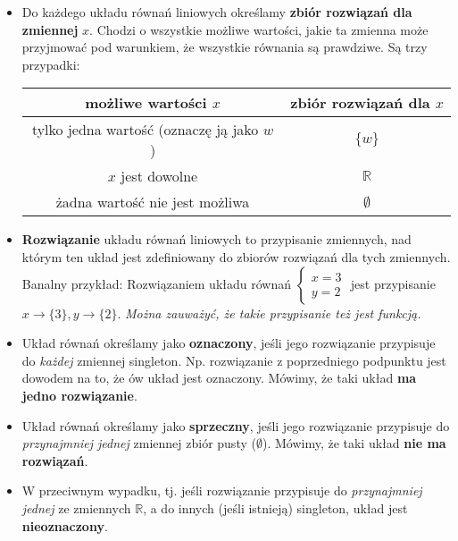 \documentclass{article}
\theoremstyle{remark}
\begin{document}
\begin{itemize}
\begin{align*}
\begin{array}{lllllll}
      4x &+& \tfrac74y &+&9z &=& 3
    \end{array}
    \right.
  \end{align*}
  Oczywiście, układ równań jest zdefiniowany nad tymi zmiennymi, nad
  którymi są zdefiniowane jego równania.
  Ale, \textit{możemy} też sobie powiedzieć,
  że pewien konkretny układ jest nad innymi zmiennymi.
  Wtedy powiemy sobie, że każde z jego równań również
  jest nad tymi zmiennymi.
  \item Do każdego układu równań liniowych określamy \textbf{zbiór rozwiązań
  dla zmiennej} $x$.
  Chodzi o wszystkie możliwe wartości, jakie ta zmienna może przyjmować
  pod warunkiem, że wszystkie równania są prawdziwe.
  Są trzy przypadki:
  \begin{center}
    \begin{tabular}{|c|c|}
      \hline
      możliwe wartości $x$ &zbiór rozwiązań dla $x$\\
      \hline\hline
      tylko jedna wartość (oznaczę ją jako $w$) & $\{w\}$\\
      \hline
      $x$ jest dowolne & $\mathbb R$\\
      \hline
      żadna wartość nie jest możliwa & $\emptyset$\\
      \hline
    \end{tabular}
  \end{center}

  \item \textbf{Rozwiązanie} układu równań liniowych to
  przypisanie zmiennych, nad którym ten układ jest zdefiniowany do
  zbiorów rozwiązań dla tych zmiennych. Banalny przykład:
  Rozwiązaniem układu równań $
    \left\{
      \begin{array}{l}
        x=3\\
        y=2
      \end{array}
    \right.$ jest przypisanie $x \to \{3\}, y \to \{2\}$.
  \textit{Można zauważyć, że takie przypisanie też jest funkcją.}

  \item Układ równań określamy jako \textbf{oznaczony}, jeśli jego
  rozwiązanie przypisuje do \textit{każdej} zmiennej singleton.
  Np. rozwiązanie z poprzedniego podpunktu jest dowodem na to, że ów układ
  jest oznaczony. Mówimy, że taki układ \textbf{ma jedno rozwiązanie}.
  \item Układ równań określamy jako \textbf{sprzeczny}, jeśli jego
  rozwiązanie przypisuje do \textit{przynajmniej jednej} zmiennej zbiór pusty ($\emptyset$).
  Mówimy, że taki układ \textbf{nie ma rozwiązań}.
  \item W przeciwnym wypadku, tj. jeśli rozwiązanie przypisuje do
  \textit{przynajmniej jednej} ze zmiennych $\mathbb R$,
  a do innych (jeśli istnieją) singleton,
  układ jest \textbf{nieoznaczony}.

\end{itemize}
\end{document}
